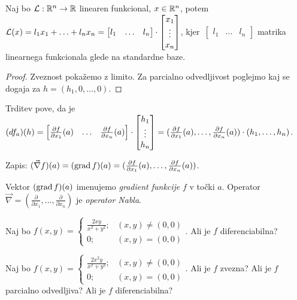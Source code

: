 \begin{opomba}
    Naj bo $\mathcal{L}: \mathbb{R}^n \to \mathbb{R}$ linearen funkcional, $x \in \mathbb{R}^n$, potem $\mathcal{L}(x) = l_1x_1+\ldots+l_nx_n = \begin{bmatrix}
        l_1 & \ldots & l_n
    \end{bmatrix} \cdot \begin{bmatrix}
        x_1 \\ \vdots \\ x_n
    \end{bmatrix}$, kjer~$\begin{bmatrix}
        l_1 & \ldots & l_n
    \end{bmatrix}$ matrika linearnega funkcionala glede na standardne baze.    
\end{opomba}

\begin{proof}
    Zveznost pokažemo z limito. Za parcialno odvedljivost poglejmo kaj se dogaja za $h = (h_1, 0, \ldots, 0)$.
\end{proof}

\begin{opomba}
    Trditev pove, da je $(df_a)(h) = \begin{bmatrix}
        \frac{\partial f}{\partial x_1}(a) & \ldots & \frac{\partial f}{\partial x_n}(a) 
    \end{bmatrix} \cdot \begin{bmatrix}
        h_1 \\ \vdots \\ h_n
    \end{bmatrix} = (\frac{\partial f}{\partial x_1}(a), \ldots, \frac{\partial f}{\partial x_n}(a)) \cdot (h_1, \ldots, h_n)$.

    Zapis: $(\vec{\nabla} f) (a) = (\operatorname{grad} f)(a) = (\frac{\partial f}{\partial x_1}(a), \ldots, \frac{\partial f}{\partial x_n}(a))$.

    Vektor $(\operatorname{grad} f)(a)$ imenujemo \emph{gradient funkcije} $f$ v točki $a$. Operator $\vec{\nabla} = (\frac{\partial}{\partial x_1}, \ldots, \frac{\partial}{\partial x_n})$ je \emph{operator Nabla}.
\end{opomba}

\begin{zgled}
    Naj bo $f(x,y) = \begin{cases}
        \frac{2xy}{x^2+y^2}; &(x,y) \neq (0,0) \\
        0; &(x,y) = (0,0)
    \end{cases}$. Ali je $f$ diferenciabilna?
\end{zgled}

\begin{zgled}
    Naj bo $f(x,y) = \begin{cases}
        \frac{2x^2y}{x^2+y^2}; &(x,y) \neq (0,0) \\
        0; &(x,y) = (0,0)
    \end{cases}$. Ali je $f$ zvezna? Ali je $f$ parcialno odvedljiva? Ali je $f$ diferenciabilna?
\end{zgled}


